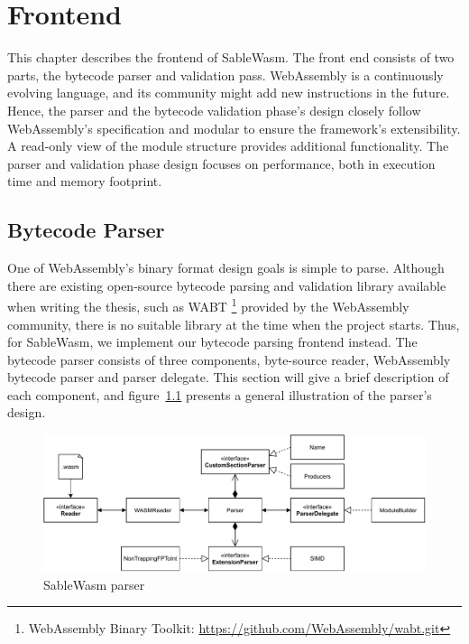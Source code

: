 \chapter{Frontend}

This chapter describes the frontend of SableWasm. The front end consists of two parts, the bytecode parser and validation pass.  WebAssembly is a continuously evolving language, and its community might add new instructions in the future. Hence, the parser and the bytecode validation phase's design closely follow WebAssembly's specification and modular to ensure the framework's extensibility. A read-only view of the module structure provides additional functionality. The parser and validation phase design focuses on performance, both in execution time and memory footprint. 

\section{Bytecode Parser}
One of WebAssembly's binary format design goals is simple to parse. Although there are existing open-source bytecode parsing and validation library available when writing the thesis, such as WABT \footnote{WebAssembly Binary Toolkit: \url{https://github.com/WebAssembly/wabt.git}} provided by the WebAssembly community, there is no suitable library at the time when the project starts. Thus, for SableWasm, we implement our bytecode parsing frontend instead. The bytecode parser consists of three components, byte-source reader, WebAssembly bytecode parser and parser delegate. This section will give a brief description of each component, and figure~\ref{fig:sablewasm-parser} presents a general illustration of the parser's design.  

\begin{figure}
  \centering
  \includegraphics[width=\textwidth]{Images/sablewasm-parser.pdf}
  \caption{SableWasm parser}
  \label{fig:sablewasm-parser}
\end{figure}

